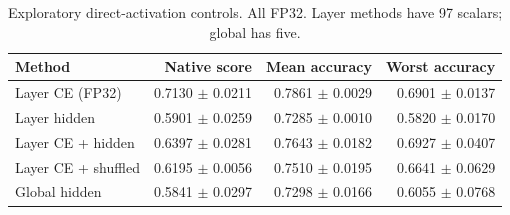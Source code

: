 \begin{table}[H]\centering\small
\caption{Exploratory direct-activation controls. All FP32. Layer methods have 97 scalars; global has five.}
\begin{tabular}{lrrr}\toprule
Method & Native score & Mean accuracy & Worst accuracy\\\midrule
Layer CE (FP32) & 0.7130 $\pm$ 0.0211 & 0.7861 $\pm$ 0.0029 & 0.6901 $\pm$ 0.0137\\
Layer hidden & 0.5901 $\pm$ 0.0259 & 0.7285 $\pm$ 0.0010 & 0.5820 $\pm$ 0.0170\\
Layer CE + hidden & 0.6397 $\pm$ 0.0281 & 0.7643 $\pm$ 0.0182 & 0.6927 $\pm$ 0.0407\\
Layer CE + shuffled & 0.6195 $\pm$ 0.0056 & 0.7510 $\pm$ 0.0195 & 0.6641 $\pm$ 0.0629\\
Global hidden & 0.5841 $\pm$ 0.0297 & 0.7298 $\pm$ 0.0166 & 0.6055 $\pm$ 0.0768\\
\bottomrule\end{tabular}\end{table}
